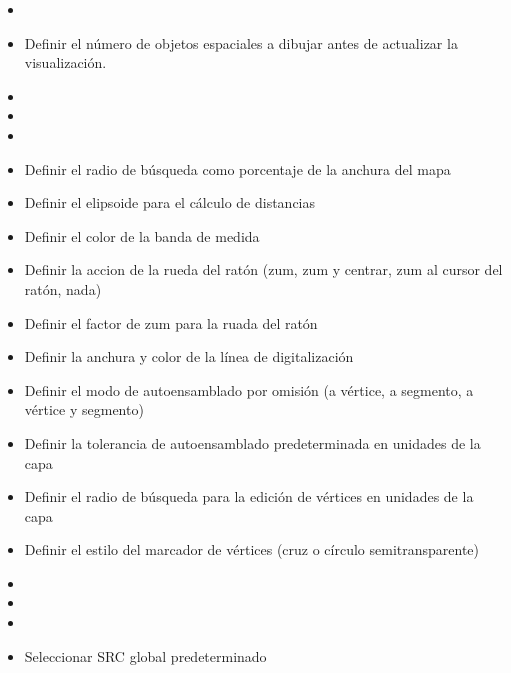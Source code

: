 
\begin{itemize}
\item {}
\item Definir el número de objetos espaciales a dibujar antes de actualizar la visualización.
\item {}
\item {}
\item {} 
\end{itemize}


\begin{itemize}
\item Definir el radio de búsqueda como porcentaje de la anchura del mapa
\item Definir el elipsoide para el cálculo de distancias
\item Definir el color de la banda de medida
\item Definir la accion de la rueda del ratón (zum, zum y centrar, zum al cursor del
ratón, nada)
\item Definir el factor de zum para la ruada del ratón
\end{itemize}


\begin{itemize}
\item Definir la anchura y color de la línea de digitalización
\item Definir el modo de autoensamblado por omisión (a vértice, a segmento, a vértice y
segmento)
\item Definir la tolerancia de autoensamblado predeterminada en unidades de la capa
\item Definir el radio de búsqueda para la edición de vértices en unidades de la capa
\item Definir el estilo del marcador de vértices (cruz o círculo semitransparente)
\end{itemize}


\begin{itemize}
\item {}
\item {}
\item {}
\item Seleccionar SRC global predeterminado
\end{itemize}

